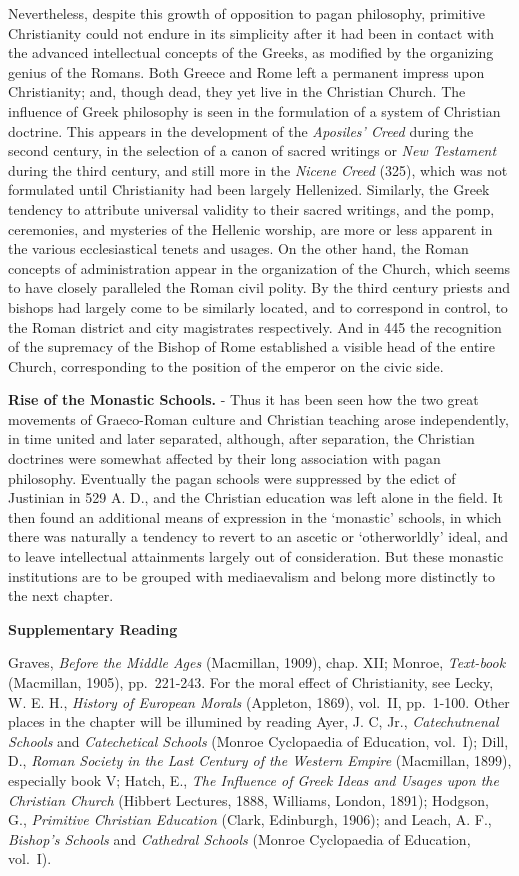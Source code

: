 \documentclass[]{book}
\begin{document}
Nevertheless, despite this growth of opposition to pagan philosophy, primitive Christianity could not endure in its simplicity after it had been in contact with the advanced intellectual concepts of the Greeks, as modified by the organizing genius of the Romans. Both Greece and Rome left a permanent impress upon Christianity; and, though dead, they yet live in the Christian Church. The influence of Greek philosophy is seen in the formulation of a system of Christian doctrine. This appears in the development of the \emph{Aposiles' Creed} during the second century, in the selection of a canon of sacred writings or \emph{New Testament} during the third century, and still more in the \emph{Nicene Creed} (325), which was not formulated until Christianity had been largely Hellenized. Similarly, the Greek tendency to attribute universal validity to their sacred writings, and the pomp, ceremonies, and mysteries of the Hellenic worship, are more or less apparent in the various ecclesiastical tenets and usages. On the other hand, the Roman concepts of administration appear in the organization of the Church, which seems to have closely paralleled the Roman civil polity. By the third century priests and bishops had largely come to be similarly located, and to correspond in control, to the Roman district and city magistrates respectively. And in 445 the recognition of the supremacy of the Bishop of Rome established a visible head of the entire Church, corresponding to the position of the emperor on the civic side.

\textbf{Rise of the Monastic Schools.} - Thus it has been seen how the two great movements of Graeco-Roman culture and Christian teaching arose independently, in time united and later separated, although, after separation, the Christian doctrines were somewhat affected by their long association with pagan philosophy. Eventually the pagan schools were suppressed by the edict of Justinian in 529 A. D., and the Christian education was left alone in the field. It then found an additional means of expression in the `monastic' schools, in which there was naturally a tendency to revert to an ascetic or `otherworldly' ideal, and to leave intellectual attainments largely out of consideration. But these monastic institutions are to be grouped with mediaevalism and belong more distinctly to the next chapter.

\textbf{Supplementary Reading}

Graves, \emph{Before the Middle Ages} (Macmillan, 1909), chap. XII; Monroe, \emph{Text-book} (Macmillan, 1905), pp.~221-243. For the moral effect of Christianity, see Lecky, W. E. H., \emph{History of European Morals} (Appleton, 1869), vol.~II, pp.~1-100. Other places in the chapter will be illumined by reading Ayer, J. C, Jr., \emph{Catechutnenal Schools} and \emph{Catechetical Schools} (Monroe Cyclopaedia of Education, vol.~I); Dill, D., \emph{Roman Society in the Last Century of the Western Empire} (Macmillan, 1899), especially book V; Hatch, E., \emph{The Influence of Greek Ideas and Usages upon the Christian Church} (Hibbert Lectures, 1888, Williams, London, 1891); Hodgson, G., \emph{Primitive Christian Education} (Clark, Edinburgh, 1906); and Leach, A. F., \emph{Bishop's Schools} and \emph{Cathedral Schools} (Monroe Cyclopaedia of Education, vol.~I).
\end{document}
